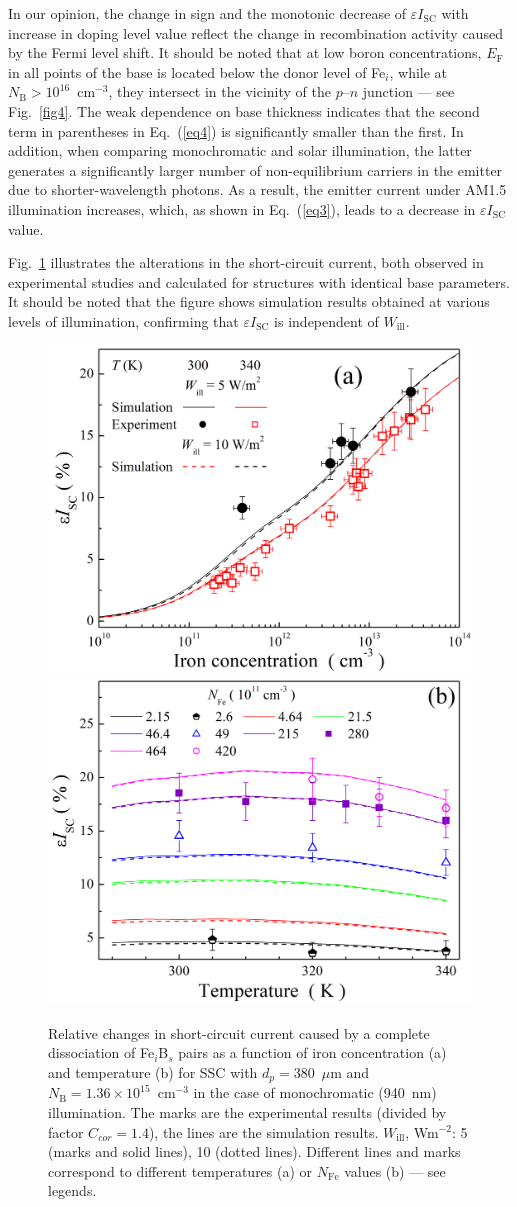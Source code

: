 \documentclass[a4paper,fleqn]{cas-sc}
\begin{document}
In our opinion, the change in sign and the monotonic decrease of $\varepsilon I_\mathrm{SC}$
with increase in doping level value
reflect the change in recombination activity caused by the Fermi level shift.
It should be noted that
at low boron concentrations, $E_\mathrm{F}$ in all points of the base is located below the donor level of Fe$_i$,
while at $N_\mathrm{B}>10^{16}$~cm$^{-3}$,
they intersect in the vicinity of the $p$–$n$ junction --- see Fig.~\ref{fig4}.
The weak dependence on base thickness indicates that the second term in parentheses in Eq.~(\ref{eq4}) is significantly smaller than the first.
In addition, when comparing monochromatic and solar illumination,
the latter generates a significantly larger number of non-equilibrium carriers in the emitter
due to shorter-wavelength photons.
As a result, the emitter current under AM1.5 illumination increases,
which, as shown in Eq.~(\ref{eq3}), leads to a decrease in $\varepsilon I_\mathrm{SC}$ value.

Fig.~\ref{fig5} illustrates the alterations in the short-circuit current,
both observed in experimental studies and calculated for structures with identical base parameters.
It should be noted that the figure shows simulation results obtained at various levels of illumination,
confirming that $\varepsilon I_\mathrm{SC}$ is independent of $W_\mathrm{ill}$.


\begin{figure}
	\centering
     \includegraphics[width=0.4\linewidth]{Fig5a.png}
     \includegraphics[width=0.4\linewidth]{Fig5b.png}
	  \caption{Relative changes in short-circuit current caused by a complete
       dissociation of Fe$_i$B$_s$ pairs as a function of iron concentration (a) and
       temperature (b) for SSC with $d_p=380$~$\mu$m and $N_\mathrm{B}=1.36\times10^{15}$~cm$^{-3}$
       in the case of monochromatic (940~nm) illumination.
       The marks are the experimental results (divided by factor $C_{cor}=1.4$), the lines are the simulation results.
       $W_\mathrm{ill}$, Wm$^{-2}$: 5 (marks and solid lines), 10 (dotted lines).
       Different lines and marks correspond to different temperatures (a) or $N_\mathrm{Fe}$ values (b) --- see legends.
}\label{fig5}
\end{figure}
\end{document}
